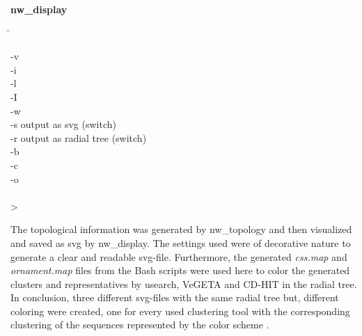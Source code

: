     \begin{leftbar}
        \textbf{nw\_display}
        \begin{nstabbing}
            \qquad \= \kill
            
            -v \\
            
            -i \\
            
            -l \\
            
            -I \\
            
            -w \\
            
            -s \> output as svg (switch)\\
            
            -r \> output as radial tree (switch)\\
            
            -b \\
            
            -c \\
            
            -o \\
            
            \\
            
            > 
        \end{nstabbing}
    \end{leftbar}

    The topological information was generated by nw\_topology and then visualized and saved as svg by nw\_display. The settings used were of decorative nature to generate a clear and readable svg-file. Furthermore, the generated \textit{css.map} and \textit{ornament.map} files from the Bash scripts were used here to color the generated clusters and representatives by usearch, VeGETA and CD-HIT in the radial tree. In conclusion, three different svg-files with the same radial tree but, different coloring were created, one for every used clustering tool with the corresponding clustering of the sequences represented by the color scheme \autocite{Newick}.

